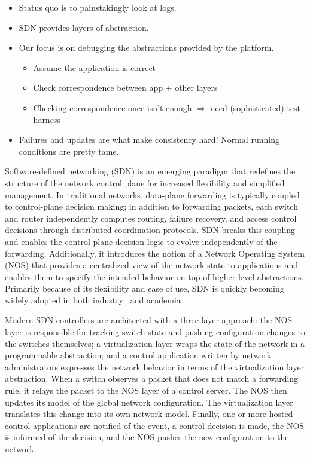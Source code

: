 \begin{itemize}
\item Status quo is to painstakingly look at logs. 
\item SDN provides layers of abstraction.
\item Our focus is on debugging the abstractions provided by the platform.
\begin{itemize}
  \item Assume the application is correct
  \item Check correspondence between app + other layers
  \item Checking correspondence once isn't enough $\Rightarrow$ need (sophisticated) test harness
\end{itemize}

\item Failures and updates are what make consistency hard! Normal running conditions are pretty tame.

\end{itemize}

Software-defined networking (SDN) is an emerging paradigm that redefines
the structure of the network control plane for increased flexibility and
simplified management. In traditional networks, data-plane forwarding is
typically coupled to control-plane decision making; in addition to forwarding
packets, each switch and router independently computes routing, failure
recovery, and access control decisions through distributed coordination protocols.
SDN breaks this coupling and enables the control plane decision logic to evolve
independently of the forwarding. Additionally, it introduces the notion of a
Network Operating System (NOS) that provides a centralized view of the network
state to applications and enables them to specify the intended behavior on top
of higher level abstractions. Primarily because of its flexibility and ease of use, SDN
is quickly becoming widely adopted in both industry~\cite{nicirahomepage,
bigswitch} and academia~\cite{nox, pox, ethane}.

Modern SDN controllers are architected with a three layer approach: the NOS
layer is responsible for tracking switch state and pushing configuration
changes to the switches themselves; a virtualization layer
wraps the state of the network in a programmable abstraction; and a control
application written by network administrators 
expresses the network behavior in terms of the virtualization layer abstraction.
When a switch observes a packet that does not match a forwarding rule, it relays the
packet to the NOS layer of a control server.
The NOS then updates its model of the global network configuration. The
virtualization layer translates this change into its own network model. 
Finally, one or more hosted control applications are notified of the event, a
control decision is made, the NOS is informed of the decision, and the NOS
pushes the new configuration to the network.

